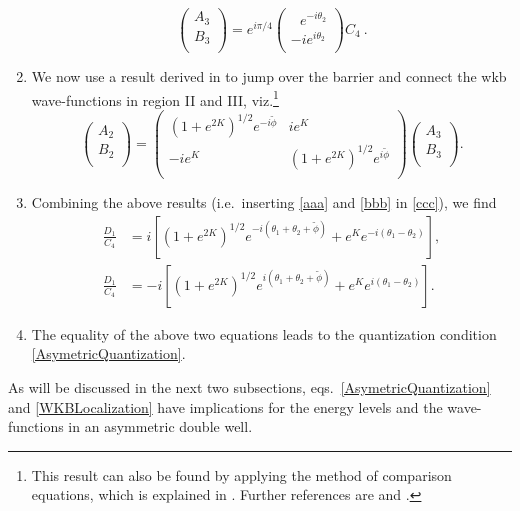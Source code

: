 \documentclass[12pt]{article}
\begin{document}
\begin{enumerate}
\begin{equation}
\left( \begin{array}{c}
A_3\\
B_3\\
\end{array} \right)=e^{i\pi/4}
\left( \begin{array}{c}
\ \ \ e^{-i\theta_2}\\
-i e^{i\theta_2}\\
\end{array} \right)C_4\ .
\label{bbb}
\end{equation}
\item We now use a result derived in \cite{Froman2} to jump over the barrier and connect the {\sc wkb} wave-functions in region II and III, viz.\footnote{This result can also be found by applying the method of comparison equations, which is explained in \cite{Zauderer}.
Further references are \cite{LynnKeller} and \cite{MillerGood}.}
\begin{equation}
\left( \begin{array}{c}
A_2\\
B_2\\
\end{array} \right)=
\left( \begin{array}{cc}
\left(1+e^{2K}\right)^{1/2}e^{-i\tilde{\phi}} & ie^K\\
-ie^K & \left(1+e^{2K}\right)^{1/2}e^{i\tilde{\phi}}\\
\end{array} \right)
\left( \begin{array}{c}
A_3\\
B_3\\\end{array} \right).
\label{ccc}
\end{equation}
\item Combining the above results (i.e.\ inserting \eqref{aaa} and \eqref{bbb} in \eqref{ccc}), we find 
\begin{align}
\label{WKBLocalization}
\frac{D_1}{C_4} &=i\left[\left(1+e^{2K}\right)^{1/2}e^{-i(\theta_1+\theta_2+\tilde{\phi})}+e^Ke^{-i(\theta_1-\theta_2)}\right],\\
\frac{D_1}{C_4} &=-i\left[\left(1+e^{2K}\right)^{1/2}e^{i(\theta_1+\theta_2+\tilde{\phi})}+e^Ke^{i(\theta_1-\theta_2)}\right].
\end{align}
\item The equality of the above two equations leads to the quantization condition \eqref{AsymetricQuantization}.
\end{enumerate}
As will be discussed in the next two subsections, eqs.\ \eqref{AsymetricQuantization} and \eqref{WKBLocalization} have implications for the energy levels and the wave-functions in an asymmetric double well.
\end{document}
